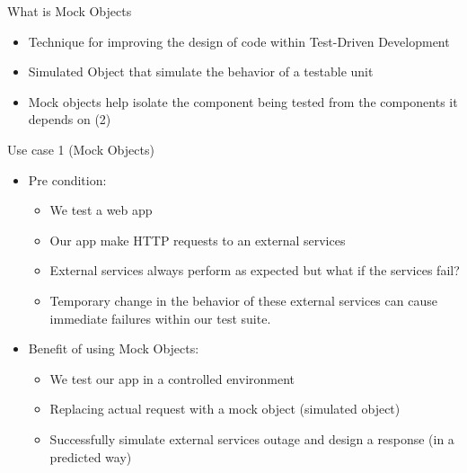 \documentclass[
  ignorenonframetext,
]{beamer}
\providecommand{\tightlist}{%
  \setlength{\itemsep}{0pt}\setlength{\parskip}{0pt}}
\begin{document}
\begin{frame}{What is Mock Objects}
\protect\hypertarget{what-is-mock-objects}{}
\begin{itemize}
\tightlist
\item
  Technique for improving the design of code within Test-Driven
  Development
\item
  Simulated Object that simulate the behavior of a testable unit
\item
  Mock objects help isolate the component being tested from the
  components it depends on (2)
\end{itemize}
\end{frame}

\begin{frame}{Use case 1 (Mock Objects)}
\protect\hypertarget{use-case-1-mock-objects}{}
\begin{itemize}
\tightlist
\item
  Pre condition:

  \begin{itemize}
  \tightlist
  \item
    We test a web app
  \item
    Our app make HTTP requests to an external services
  \item
    External services always perform as expected but what if the
    services fail?
  \item
    Temporary change in the behavior of these external services can
    cause immediate failures within our test suite.
  \end{itemize}
\item
  Benefit of using Mock Objects:

  \begin{itemize}
  \tightlist
  \item
    We test our app in a controlled environment
  \item
    Replacing actual request with a mock object (simulated object)
  \item
    Successfully simulate external services outage and design a response
    (in a predicted way)
  \end{itemize}
\end{itemize}
\end{frame}
\end{document}
